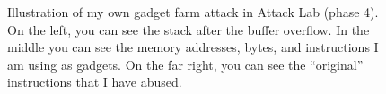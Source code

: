 \begin{figure}[H]
  \centering
  \hbox{}
  \caption{Illustration of my own gadget farm attack in Attack Lab (phase 4). On the left, you can see the stack after the buffer overflow. In the middle you can see the memory addresses, bytes, and instructions I am using as gadgets. On the far right, you can see the ``original'' instructions that I have abused.}
  \label{fig:gadget-stack-memory}
\end{figure}
